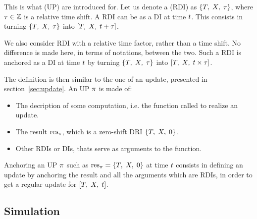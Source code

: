 This is what  (UP) are introduced for. Let us denote a  (RDI) as $\left\{ T,\;X,\;\tau \right\}$, where ${\tau}\in{\mathbb{Z}}$ is a relative time shift. A RDI can be  as a DI at time $t$. This consists in turning $\left\{ T,\;X,\;\tau \right\}$ into $\left[ T,\;X,\;{t}+{\tau} \right]$.

We also consider RDI with a relative time factor, rather than a time shift. No difference is made here, in terms of notations, between the two. Such a RDI is anchored as a DI at time $t$ by turning $\left\{ T,\;X,\;\tau \right\}$ into $\left[ T,\;X,\;{t}\times{\tau} \right]$.


The definition is then similar to the one of an update, presented in section~\ref{sec:update}.
An UP $\pi$ is made of:
\begin{itemize}
\item The decription of some computation, i.e. the function called to realize an update.
\item The result ${\mathrm{res}}_{\pi}$, which is a zero-shift DRI $\left\{ T,\;X,\;0 \right\}$.
\item Other RDIs or DIs, thats serve as arguments to the function.
\end{itemize}

Anchoring an UP $\pi$ such as ${{\mathrm{res}}_{\pi}}={\left\{ T,\;X,\;0 \right\}}$ at time $t$ consists in defining an update by anchoring the result and all the arguments which are RDIs, in order to get a regular update for $\left[ T,\;X,\;t \right]$.


\subsection{Simulation}


